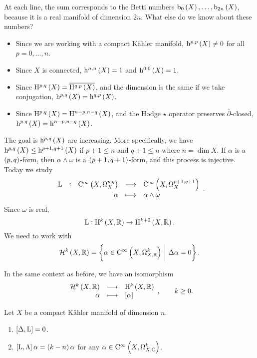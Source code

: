 \pagebreak

At each line, the sum corresponds to the Betti numbers $ \b_0\br{X}, \dots, \b_{2n}\br{X} $, because it is a real manifold of dimension $ 2n $. What else do we know about these numbers?
\begin{itemize}
\item Since we are working with a compact K\"ahler manifold, $ \h^{p, p}\br{X} \ne 0 $ for all $ p = 0, \dots, n $.
\item Since $ X $ is connected, $ \h^{n, n}\br{X} = 1 $ and $ \h^{0, 0}\br{X} = 1 $.
\item Since $ \H^{p, q}\br{X} = \overline{\H^{q, p}\br{X}} $, and the dimension is the same if we take conjugation, $ \h^{p, q}\br{X} = \h^{q, p}\br{X} $.
\item Since $ \H^{p, q}\br{X} = \H^{n - p, n - q}\br{X} $, and the Hodge $ \star $ operator preserves $ \overline{\partial} $-closed, $ \h^{p, q}\br{X} = \h^{n - p, n - q}\br{X} $.
\end{itemize}
The goal is $ \h^{p, q}\br{X} $ are increasing. More specifically, we have $ \h^{p, q}\br{X} \le \h^{p + 1, q + 1}\br{X} $ if $ p + 1 \le n $ and $ q + 1 \le n $ where $ n = \dim X $. If $ \alpha $ is a $ \br{p, q} $-form, then $ \alpha \wedge \omega $ is a $ \br{p + 1, q + 1} $-form, and this process is injective. Today we study
$$ \function[\L]{\C^\infty\br{X, \Omega_X^{p, q}}}{\C^\infty\br{X, \Omega_X^{p + 1, q+ 1}}}{\alpha}{\alpha \wedge \omega}. $$
Since $ \omega $ is real,
$$ \L : \H^k\br{X, \RR} \to \H^{k + 2}\br{X, \RR}. $$
We need to work with
$$ \HHH^k\br{X, \RR} = \cbr{\alpha \in \C^\infty\br{X, \Omega_{X, \RR}^k} \st \Delta\alpha = 0}. $$

\begin{corollary}
In the same context as before, we have an isomorphism
$$ \function{\HHH^k\br{X, \RR}}{\H^k\br{X, \RR}}{\alpha}{\sbr{\alpha}}, \qquad k \ge 0. $$
\end{corollary}

\begin{lemma}
\label{lem:6.41}
Let $ X $ be a compact K\"ahler manifold of dimension $ n $.
\begin{enumerate}
\item $ \sbr{\Delta, \L} = 0 $.
\item $ \sbr{\L, \Lambda}\alpha = \br{k - n}\alpha $ for any $ \alpha \in \C^\infty\br{X, \Omega_{X, \CC}^k} $.
\end{enumerate}
\end{lemma}

